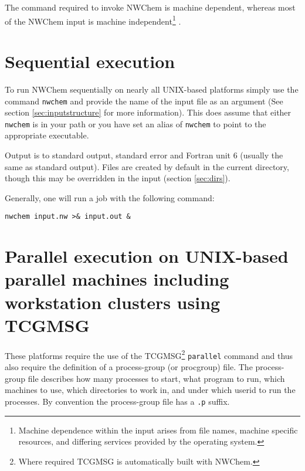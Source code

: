 
The command required to invoke NWChem is machine dependent, whereas
most of the NWChem input is machine independent\footnote{Machine
dependence within the input arises from file names, machine
specific resources, and differing services provided by the operating system.} .

\section{Sequential execution}

To run NWChem sequentially on nearly all UNIX-based platforms simply
use the command \verb+nwchem+ and provide the name of the input file
as an argument (See section \ref{sec:inputstructure} for more information).
This does assume that either \verb+nwchem+ is in your path or you have
set an alias of \verb+nwchem+ to point to the appropriate executable.

Output is to standard output, standard error and Fortran unit 6
(usually the same as standard output).  Files are created by default
in the current directory, though this may be overridden in the input
(section \ref{sec:dirs}).

Generally, one will run a job with the following command:

\verb+nwchem input.nw >& input.out &+

\section{Parallel execution on UNIX-based parallel machines
including workstation clusters using TCGMSG}
\label{sec:procgrp}

 These platforms require the use of the TCGMSG\footnote{Where required
TCGMSG is automatically built with NWChem.} \verb+parallel+ command
and thus also require the definition of a process-group (or procgroup)
file.  The process-group file describes how many processes to start,
what program to run, which machines to use, which directories to work
in, and under which userid to run the processes.  By convention the
process-group file has a \verb+.p+ suffix.


